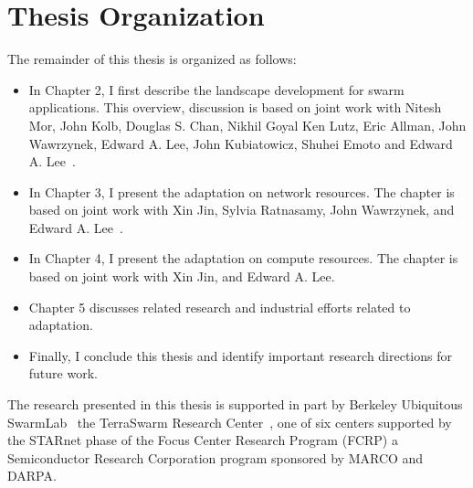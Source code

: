 \documentclass[thesis.tex]{subfiles}
\begin{document}
\section{Thesis Organization}
\label{sec:thesis-organization}

The remainder of this thesis is organized as follows:

\begin{itemize}
\item In Chapter 2, I first describe the landscape development for swarm
  applications. This overview, discussion is based on joint work with Nitesh
  Mor, John Kolb, Douglas S. Chan, Nikhil Goyal Ken Lutz, Eric Allman, John
  Wawrzynek, Edward A. Lee, John Kubiatowicz, Shuhei Emoto and Edward
  A. Lee~\cite{zhang2015cloud}.
\item In Chapter 3, I present the adaptation on network resources. The chapter
  is based on joint work with Xin Jin, Sylvia Ratnasamy, John Wawrzynek, and
  Edward A. Lee~\cite{zhang2018awstream}.
\item In Chapter 4, I present the adaptation on compute resources. The chapter
  is based on joint work with Xin Jin, and Edward A. Lee.
\item Chapter 5 discusses related research and industrial efforts related to
  adaptation.
\item Finally, I conclude this thesis and identify important research directions
  for future work.
\end{itemize}

The research presented in this thesis is supported in part by Berkeley
Ubiquitous SwarmLab~\cite{swarmlab} the TerraSwarm Research
Center~\cite{terraswarm}, one of six centers supported by the STARnet phase of
the Focus Center Research Program (FCRP) a Semiconductor Research Corporation
program sponsored by MARCO and DARPA.
\end{document}
